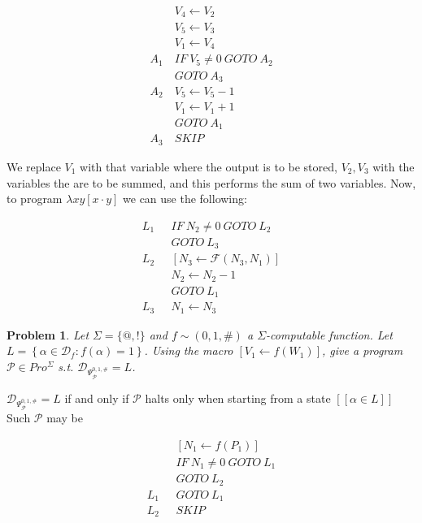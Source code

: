 \documentclass[a4paper, 12pt]{article}
\newtheorem{problem}{Problem}
\newtheorem{problem}{Problem}
\begin{document}
\begin{align*}
    &V_4 \leftarrow V_2 \\ 
    &V_5 \leftarrow  V_3 \\ 
    &V_1 \leftarrow V_4 \\ 
    A_1 ~ & IF ~ V_5 \neq 0 ~ GOTO ~ A_2 \\ 
    & GOTO~ A_3 \\ 
    A_2 ~ & V_5 \leftarrow V_5 - 1 \\ 
          &V_1 \leftarrow V_1 + 1 \\ 
          &GOTO ~ A_1 \\ 
    A_3 ~ & SKIP
\end{align*}

We replace $V_1$ with that variable where the output is to be stored, $V_2, V_3$
with the variables the are to be summed, and this performs the sum of two
variables. Now, to program $\lambda xy[x \cdot y]$ we can use the following:

\begin{align*}
    L_1 ~ ~ ~ & IF ~ N_2 \neq 0 ~ GOTO ~ L_2 \\ 
              & GOTO ~ L_3 \\ 
    L_2 ~ ~ ~ & \left[ N_3 \leftarrow \mathcal{F}(N_3, N_1) \right]  \\ 
              &N_2 \leftarrow  N_2 - 1 \\ 
              &GOTO ~ L_1 \\ 
    L_3 ~ ~ ~ &N_1 \leftarrow N_3
\end{align*}

\begin{problem}
    Let $\Sigma = \{@, !\}$ and $f \sim (0, 1, \#)$ a $\Sigma$-computable
    function. Let $L = \left\{ \alpha \in \mathcal{D}_f : f(\alpha) = 1 \right\}
    $. Using the macro $\left[ V_1 \leftarrow f(W_1) \right] $, give a program
    $\mathcal{P} \in Pro^{\Sigma}$ s.t. $\mathcal{D}_{\Psi_{\mathcal{P}}^{0, 1,
    \#}} = L$.
\end{problem}

$\mathcal{D}_{\Psi_{\mathcal{P}}^{0, 1, \#}} = L$ if and only if $\mathcal{P}$
halts only when starting from a state $[\![ \alpha \in L ]\!]$
Such $\mathcal{P}$ may be 

\begin{align*}
    &[N_1 \leftarrow f(P_1)]\\
    &IF ~ N_1 \neq 0 ~ GOTO  ~ L_1 \\ 
    &GOTO ~ L_2 \\ 
    L_1  ~ ~ ~ & GOTO ~ L_1 \\ 
    L_2 ~ ~ ~ & SKIP
\end{align*}
\end{document}
